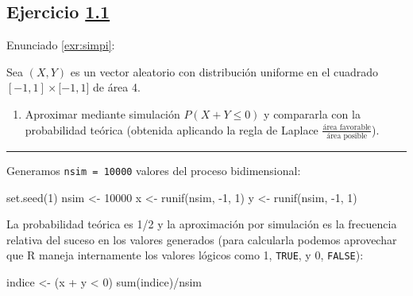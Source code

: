 \documentclass[
]{book}
\newenvironment{Shaded}{\begin{snugshade}}{\end{snugshade}}
\newcommand{\DecValTok}[1]{\textcolor[rgb]{0.00,0.00,0.81}{#1}}
\newcommand{\FunctionTok}[1]{\textcolor[rgb]{0.00,0.00,0.00}{#1}}
\newcommand{\NormalTok}[1]{#1}
\newcommand{\OtherTok}[1]{\textcolor[rgb]{0.56,0.35,0.01}{#1}}
\newcommand{\SpecialCharTok}[1]{\textcolor[rgb]{0.00,0.00,0.00}{#1}}
\providecommand{\tightlist}{%
  \setlength{\itemsep}{0pt}\setlength{\parskip}{0pt}}
\theoremstyle{break}
\theoremstyle{nonumberplain}
\begin{document}
\hypertarget{sol-simpi}{%
\subsection{\texorpdfstring{Ejercicio \href{ejercicios.html\#exr:simpi}{1.1}}{Ejercicio 1.1}}\label{sol-simpi}}

Enunciado \ref{exr:simpi}:

Sea \((X,Y)\) es un vector aleatorio con distribución uniforme en el
cuadrado \([-1,1]\times\lbrack-1,1]\) de área 4.

\begin{enumerate}
\def\labelenumi{\alph{enumi})}
\tightlist
\item
  Aproximar mediante simulación \(P\left(X + Y \leq 0 \right)\) y
  compararla con la probabilidad teórica (obtenida aplicando la
  regla de Laplace \(\frac{\text{área favorable}}{\text{área posible}}\)).
\end{enumerate}

\begin{center}\rule{0.5\linewidth}{0.5pt}\end{center}

Generamos \texttt{nsim\ =\ 10000} valores del proceso bidimensional:

\begin{Shaded}
\begin{Highlighting}[]
\FunctionTok{set.seed}\NormalTok{(}\DecValTok{1}\NormalTok{)}
\NormalTok{nsim }\OtherTok{\textless{}{-}} \DecValTok{10000}
\NormalTok{x }\OtherTok{\textless{}{-}} \FunctionTok{runif}\NormalTok{(nsim, }\SpecialCharTok{{-}}\DecValTok{1}\NormalTok{, }\DecValTok{1}\NormalTok{)}
\NormalTok{y }\OtherTok{\textless{}{-}} \FunctionTok{runif}\NormalTok{(nsim, }\SpecialCharTok{{-}}\DecValTok{1}\NormalTok{, }\DecValTok{1}\NormalTok{)}
\end{Highlighting}
\end{Shaded}

La probabilidad teórica es 1/2 y la aproximación por simulación es la frecuencia relativa del suceso en los valores generados (para calcularla podemos aprovechar que R maneja internamente los valores lógicos como 1, \texttt{TRUE}, y 0, \texttt{FALSE}):

\begin{Shaded}
\begin{Highlighting}[]
\NormalTok{indice }\OtherTok{\textless{}{-}}\NormalTok{ (x }\SpecialCharTok{+}\NormalTok{ y }\SpecialCharTok{\textless{}} \DecValTok{0}\NormalTok{)}
\FunctionTok{sum}\NormalTok{(indice)}\SpecialCharTok{/}\NormalTok{nsim}
\end{Highlighting}
\end{Shaded}
\end{document}
